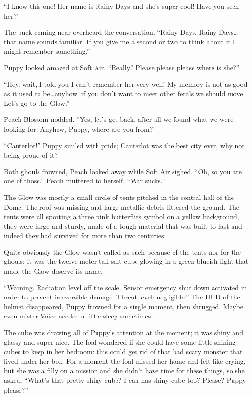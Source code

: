 ``I know this one! Her name is Rainy Days and she's super cool! Have you seen her?''

The buck coming near overheard the conversation. ``Rainy Days, Rainy Days\dots that name sounds familiar. If you give me a second or two to think about it I might remember something.''

Puppy looked amazed at Soft Air. ``Really? Please please please where is she?''

``Hey, wait, I told you I can't remember her very well! My memory is not as good as it used to be\dots anyhow, if you don't want to meet other ferals we should move. Let's go to the Glow.''

Peach Blossom nodded. ``Yes, let's get back, after all we found what we were looking for. Anyhow, Puppy, where are you from?''

``Canterlot!'' Puppy smiled with pride; Canterlot was the best city ever, why not being proud of it?

Both ghouls frowned, Peach looked away while Soft Air sighed. ``Oh, so you are one of those.'' Peach muttered to herself. ``War sucks.''

\horizonline


The Glow was mostly a small circle of tents pitched in the central hall of the Dome. The roof was missing and large metallic debris littered the ground. The tents were all sporting a three pink butterflies symbol on a yellow background, they were large and sturdy, made of a tough material that was built to last and indeed they had survived for more than two centuries.

Quite obviously the Glow wasn't called as such because of the tents nor for the ghouls: it was the twelve meter tall salt cube glowing in a green blueish light that made the Glow deserve its name.

``{\mt Warning. Radiation level off the scale. Sensor emergency shut down activated in order to prevent irreversible damage. Threat level: negligible.}'' The HUD of the helmet disappeared, Puppy frowned for a single moment, then shrugged. Maybe even mister Voice needed a little sleep sometimes.

The cube was drawing all of Puppy's attention at the moment; it was shiny and glassy and super nice. The foal wondered if she could have some little shining cubes to keep in her bedroom: this could get rid of that bad scary monster that lived under her bed. For a moment the foal missed her home and felt like crying, but she was a filly on a mission and she didn't have time for these things, so she asked, ``What's that pretty shiny cube? I can has shiny cube too? Please? Puppy please?''

